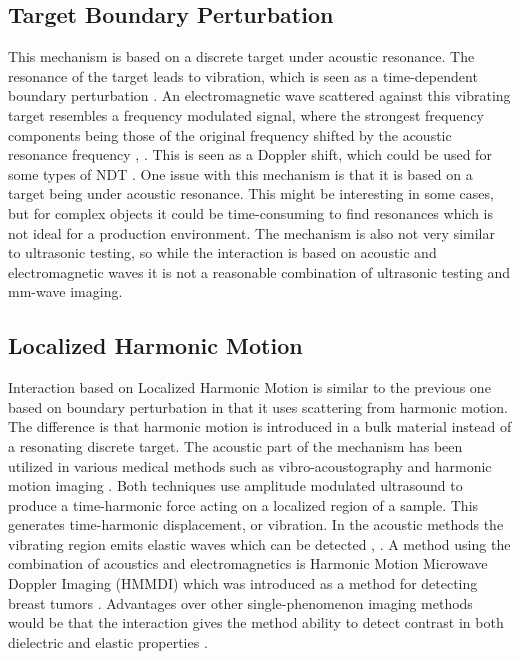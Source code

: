 \documentclass[11pt,twoside]{eitExjobb}
\begin{document}
	\subsection{Target Boundary Perturbation}
	This mechanism is based on a discrete target under acoustic resonance. The resonance of the target leads to vibration, which is seen as a time-dependent boundary perturbation \cite{Buerkle2007}. An electromagnetic wave scattered against this vibrating target resembles a frequency modulated signal, where the strongest frequency components being those of the original frequency shifted by the acoustic resonance frequency \cite{Buerkle2008}, \cite{Sarabandi2003}. This is seen as a Doppler shift, which could be used for some types of NDT \cite{Buerkle2009}. One issue with this mechanism is that it is based on a target being under acoustic resonance. This might be interesting in some cases, but for complex objects it could be time-consuming to find resonances which is not ideal for a production environment. The mechanism is also not very similar to ultrasonic testing, so while the interaction is based on acoustic and electromagnetic waves it is not a reasonable combination of ultrasonic testing and mm-wave imaging.
	
	\subsection{Localized Harmonic Motion}
	Interaction based on Localized Harmonic Motion is similar to the previous one based on boundary perturbation in that it uses scattering from harmonic motion. The difference is that harmonic motion is introduced in a bulk material instead of a resonating discrete target. The acoustic part of the mechanism has been utilized in various medical methods such as vibro-acoustography and harmonic motion imaging \cite{Wang2018}. Both techniques use amplitude modulated ultrasound to produce a time-harmonic force acting on a localized region of a sample. This generates time-harmonic displacement, or vibration. In the acoustic methods the vibrating region emits elastic waves which can be detected \cite{Fatemi1998}, \cite{Konofagou2003}. A method using the combination of acoustics and electromagnetics is Harmonic Motion Microwave Doppler Imaging (HMMDI) which was introduced as a method for detecting breast tumors \cite{Top2014}. Advantages over other single-phenomenon imaging methods would be that the interaction gives the method ability to detect contrast in both dielectric and elastic properties \cite{Top2016}.
	
\end{document}
